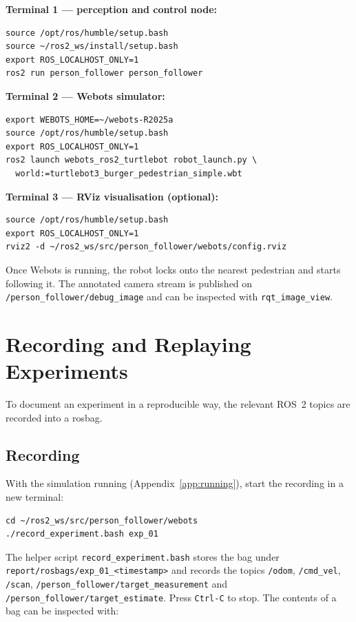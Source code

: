 \documentclass[12pt,a4paper]{article}
\begin{document}
\textbf{Terminal 1 --- perception and control node:}
\begin{verbatim}
source /opt/ros/humble/setup.bash
source ~/ros2_ws/install/setup.bash
export ROS_LOCALHOST_ONLY=1
ros2 run person_follower person_follower
\end{verbatim}

\textbf{Terminal 2 --- Webots simulator:}
\begin{verbatim}
export WEBOTS_HOME=~/webots-R2025a
source /opt/ros/humble/setup.bash
export ROS_LOCALHOST_ONLY=1
ros2 launch webots_ros2_turtlebot robot_launch.py \
  world:=turtlebot3_burger_pedestrian_simple.wbt
\end{verbatim}

\textbf{Terminal 3 --- RViz visualisation (optional):}
\begin{verbatim}
source /opt/ros/humble/setup.bash
export ROS_LOCALHOST_ONLY=1
rviz2 -d ~/ros2_ws/src/person_follower/webots/config.rviz
\end{verbatim}

Once Webots is running, the robot locks onto the nearest pedestrian and starts
following it. The annotated camera stream is published on
\texttt{/person\_\allowbreak follower/\allowbreak debug\_image} and can be inspected with
\texttt{rqt\_image\_view}.

\section{Recording and Replaying Experiments}
\label{app:rosbags}

To document an experiment in a reproducible way, the relevant ROS~2 topics are
recorded into a rosbag.

\subsection{Recording}

With the simulation running (Appendix~\ref{app:running}), start the recording
in a new terminal:

\begin{verbatim}
cd ~/ros2_ws/src/person_follower/webots
./record_experiment.bash exp_01
\end{verbatim}

The helper script \texttt{record\_experiment.bash} stores the bag under
\texttt{report/\allowbreak rosbags/\allowbreak exp\_01\_\allowbreak<timestamp>} and records the topics
\texttt{/odom}, \texttt{/cmd\_vel}, \texttt{/scan},
\texttt{/person\_\allowbreak follower/\allowbreak target\_\allowbreak measurement} and
\texttt{/person\_\allowbreak follower/\allowbreak target\_\allowbreak estimate}. Press \texttt{Ctrl-C} to stop.
The contents of a bag can be inspected with:
\end{document}
